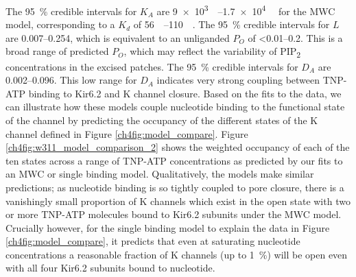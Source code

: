 The \SI{95}{\percent} credible intervals for $K_A$ are \SIrange{9e3}{1.7e4}{\per\Molar} for the MWC model, corresponding to a $K_d$ of \SIrange{56}{110}{\micro\Molar}.
The \SI{95}{\percent} credible intervals for $L$ are \numrange{.007}{.254}, which is equivalent to an unliganded $P_O$ of \numrange{<0.01}{0.2}.
This is a broad range of predicted $P_O$, which may reflect the variability of PIP\textsubscript{2} concentrations in the excised patches.
The \SI{95}{\percent} credible intervals for $D_A$ are \numrange{.002}{.096}.
This low range for $D_A$ indicates very strong coupling between TNP-ATP binding to Kir6.2 and K\ATP{} channel closure.
Based on the fits to the data, we can illustrate how these models couple nucleotide binding to the functional state of the channel by predicting the occupancy of the different states of the K\ATP{} channel defined in Figure \ref{ch4fig:model_compare}.
Figure \ref{ch4fig:w311_model_comparison_2} shows the weighted occupancy of each of the ten states across a range of TNP-ATP concentrations as predicted by our fits to an MWC or single binding model.
Qualitatively, the models make similar predictions; as nucleotide binding is so tightly coupled to pore closure, there is a vanishingly small proportion of K\ATP{} channels which exist in the open state with two or more TNP-ATP molecules bound to Kir6.2 subunits under the MWC model.
Crucially however, for the single binding model to explain the data in Figure \ref{ch4fig:model_compare}, it predicts that even at saturating nucleotide concentrations a reasonable fraction of K\ATP{} channels (up to \SI{1}{\percent}) will be open even with all four Kir6.2 subunits bound to nucleotide.

